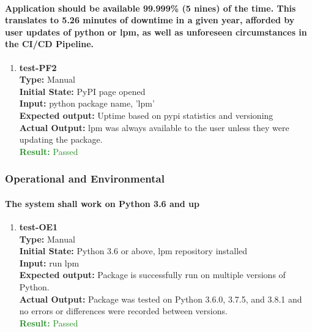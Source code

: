 \documentclass[12pt, titlepage]{article}
\begin{document}
\paragraph{Application should be available 99.999\% (5 nines) of the time. This translates
to 5.26 minutes of downtime in a given year, afforded by user updates of python or lpm,
as well as unforeseen circumstances in the CI/CD Pipeline.}
\begin{enumerate}
    \item{\textbf{test-PF2}\\}
    \textbf{Type:} Manual\\
    \textbf{Initial State:} PyPI page opened\\
    \textbf{Input:} python package name, 'lpm'\\
    \textbf{Expected output: } Uptime based on pypi statistics and versioning\\
    \textbf{Actual Output:} lpm was always available to the user unless they were updating the package. \\
    \textcolor{ForestGreen}{\textbf{Result:} Passed}
\end{enumerate}

\subsubsection{Operational and Environmental}
\paragraph{The system shall work on Python 3.6 and up}
\begin{enumerate}
    \item{\textbf{test-OE1}\\}
    \textbf{Type:} Manual\\
    \textbf{Initial State:} Python 3.6 or above, lpm repository installed\\
    \textbf{Input:} run lpm\\
    \textbf{Expected output: } Package is successfully run on multiple versions of Python. \\
    \textbf{Actual Output:} Package was tested on Python 3.6.0, 3.7.5, and 3.8.1 and no errors or differences were recorded between versions. \\
    \textcolor{ForestGreen}{\textbf{Result:} Passed}
\end{enumerate}
\end{document}
